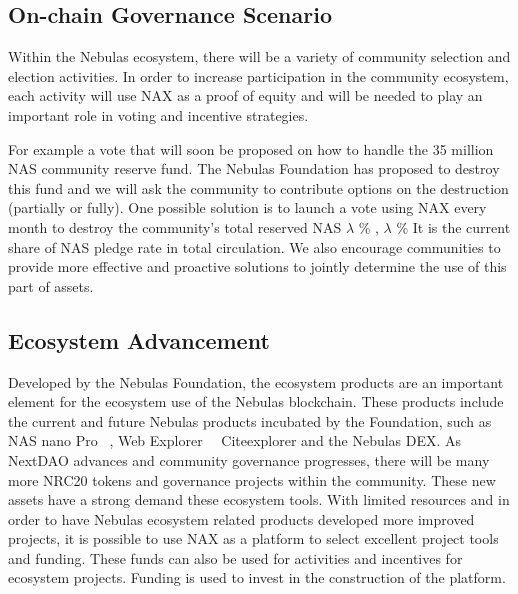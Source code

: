 \subsection{On-chain Governance Scenario}
Within the Nebulas ecosystem, there will be a variety of community selection and election activities. In order to increase participation in the community ecosystem, each activity will use NAX as a proof of equity and will be needed to play an important role in voting and incentive strategies.

For example a vote that will soon be proposed on how to handle the 35 million NAS community reserve fund. The Nebulas Foundation has proposed to destroy this fund and we will ask the community to contribute options on the destruction (partially or fully). One possible solution is to launch a vote using NAX every month to destroy the community's total reserved NAS \(\lambda\) \% , \(\lambda\) \% It is the current share of NAS pledge rate in total circulation. We also encourage communities to provide more effective and proactive solutions to jointly determine the use of this part of assets.


\subsection{Ecosystem Advancement}
Developed by the Nebulas Foundation, the ecosystem products are an important element for the ecosystem use of the Nebulas blockchain. These products include the current and future Nebulas products incubated by the Foundation, such as NAS nano Pro ~\cite{NASnano}, Web Explorer ~\ Cite{explorer} and the Nebulas DEX. As NextDAO advances and community governance progresses, there will be many more NRC20 tokens and governance projects within the community. These new assets have a strong demand these ecosystem tools. With limited resources and in order to have Nebulas ecosystem related products developed more improved projects, it is possible to use NAX as a platform to select excellent project tools and funding. These funds can also be used for activities and incentives for ecosystem projects. Funding is used to invest in the construction of the platform.
